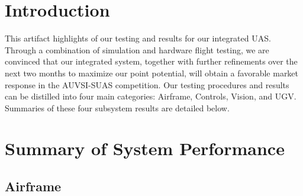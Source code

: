 \documentclass[]{auvsi_doc}
\begin{document}
\begin{AUVSITitlePage}
\begin{artifacttable}
\end{artifacttable}
\end{AUVSITitlePage}

\section{Introduction}

This artifact highlights of our testing and results for our integrated UAS. Through
a combination of simulation and hardware flight testing, we are convinced that our integrated system, together with further refinements over the next two months to maximize our point potential, will obtain a favorable market response in the AUVSI-SUAS competition. Our testing procedures and results can be distilled into four main categories: Airframe, Controls, Vision, and UGV. Summaries of these four subsystem results are detailed below.

\section{Summary of System Performance}



\subsection{Airframe}
\end{document}
